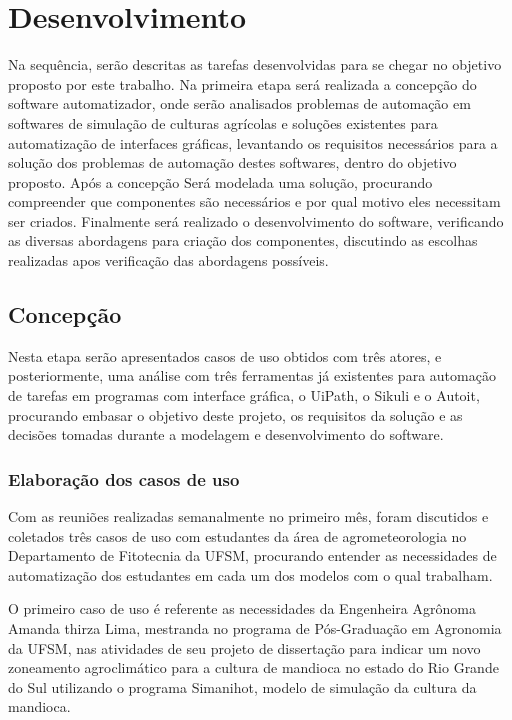 \documentclass[tg]{mdtufsm}
\begin{document}
	\chapter{Desenvolvimento}

        Na sequência, serão descritas as tarefas desenvolvidas para se chegar no objetivo proposto por este trabalho.
        Na primeira etapa será realizada a concepção do software automatizador, onde serão analisados problemas de automação em softwares de simulação de culturas agrícolas e soluções existentes para automatização de interfaces gráficas, levantando os requisitos necessários para a solução dos problemas de automação destes softwares, dentro do objetivo proposto.
        Após a concepção Será modelada uma solução, procurando compreender que componentes são necessários e por qual motivo eles necessitam ser criados.
        Finalmente será realizado o desenvolvimento do software, verificando as diversas abordagens para criação dos componentes, discutindo as escolhas realizadas apos verificação das abordagens possíveis.

        \section{Concepção}

            Nesta etapa serão apresentados casos de uso obtidos com três atores, e posteriormente, uma análise com três ferramentas já existentes para automação de tarefas em programas com interface gráfica, o UiPath, o Sikuli e o Autoit, procurando embasar o objetivo deste projeto, os requisitos da solução e as decisões tomadas durante a modelagem e desenvolvimento do software.

            \subsection{Elaboração dos casos de uso}

                Com as reuniões realizadas semanalmente no primeiro mês, foram discutidos e coletados três casos de uso com estudantes da área de agrometeorologia no Departamento de Fitotecnia da UFSM, procurando entender as necessidades de automatização dos estudantes em cada um dos modelos com o qual trabalham.

            	O primeiro caso de uso é referente as necessidades da Engenheira Agrônoma Amanda thirza Lima, mestranda no programa de Pós-Graduação em Agronomia da UFSM, nas atividades de seu projeto de dissertação para indicar um novo zoneamento agroclimático para a cultura de mandioca no estado do Rio Grande do Sul utilizando o programa Simanihot, modelo de simulação da cultura da mandioca.
\end{document}
